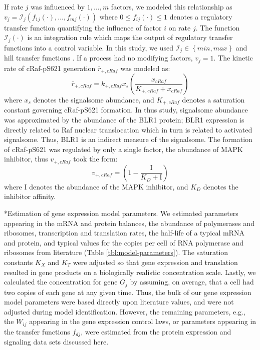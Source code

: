 \documentclass[12pt]{article}
\makeatletter
\renewcommand\subsubsection{\@startsection
	{subsubsection}{2}{0mm}
	{-0.05in}
	{-0.5\baselineskip}
	{\normalfont\normalsize\itshape}}
\makeatother
\begin{document}
If rate $j$ was influenced by $1,\dots,m$ factors, we modeled this relationship as
$v_{j}=\mathcal{I}_{j}\left(f_{1j}\left(\cdot\right),\hdots,f_{mj}\left(\cdot\right)\right)$
where $0\leq f_{ij}\left(\cdot\right)\leq 1$ denotes a regulatory transfer function quantifying the influence of factor $i$ on rate $j$.
The function $\mathcal{I}_{j}\left(\cdot\right)$ is an integration rule which maps the output of regulatory transfer functions into a control
variable. In this study, we used $\mathcal{I}_{j}\in\left\{min,max\right\}$ and hill transfer functions \cite{pr3010138}.
If a process had no modifying factors, $v_{j}=1$.
The kinetic rate of cRaf-pS621 generation $\bar{r}_{+,cRaf}$ was modeled as:
\begin{equation}
	\bar{r}_{+,cRaf} = k_{+,cRaf}x_{s}\left(\frac{x_{cRaf}}{K_{+,cRaf}+x_{cRaf}}\right)
\end{equation}where $x_{s}$ denotes the signalsome abundance, and $K_{+,cRaf}$ denotes a saturation constant governing cRaf-pS621 formation.
In thus study, signalsome abundance was approximated by the abundance of the BLR1 protein;
BLR1 expression is directly related to Raf nuclear translocation which in turn is related to activated signalsome.
Thus, BLR1 is an indirect measure of the signalsome.
The formation of cRaf-pS621 was regulated by only a single factor, the abundance of MAPK inhibitor, thus $v_{+,cRaf}$ took the form:
\begin{equation}
	v_{+,cRaf} = \left(1-\frac{\mathrm{I}}{K_{D}+\mathrm{I}}\right)
\end{equation}where $\mathrm{I}$ denotes the abundance of the MAPK inhibitor, and $K_{D}$ denotes the inhibitor affinity.

\noindent\subsubsection*{Estimation of gene expression model parameters.}
We estimated parameters appearing in the mRNA and protein balances, the abundance of polymerases and ribosomes,
transcription and translation rates, the half-life of a typical mRNA and protein,
and typical values for the copies per cell of RNA polymerase and ribosomes from literature (Table \ref{tbl:model-parameters}).
The saturation constants $K_{X}$ and $K_{T}$ were adjusted so that gene expression and translation resulted in gene products on a biologically realistic concentration scale.
Lastly, we calculated the concentration for gene $G_{j}$ by assuming, on average, that a cell had two copies of each gene at any given time.
Thus, the bulk of our gene expression model parameters were based directly upon literature values, and were not adjusted during model identification.
However, the remaining parameters, e.g., the $W_{ij}$ appearing in the gene expression control laws,
or parameters appearing in the transfer functions $f_{dj}$, were estimated from the protein expression and signaling data sets discussed here.
\end{document}
